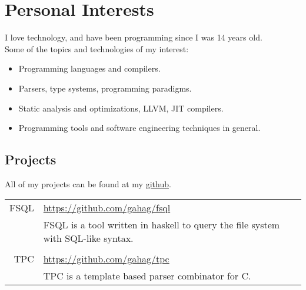 \documentclass[a4paper,10pt]{article}
\newcommand{\cpp}{C\protect\scalebox{0.8}{\protect\raisebox{0.4ex}{++}}}
\renewcommand\#{\protect\scalebox{0.8}{\protect\raisebox{0.4ex}{\char"0023}}}
\begin{document}
\section{Personal Interests}
I love technology, and have been programming since I was 14 years old. \\
Some of the topics and technologies of my interest:
\vspace{-3pt}
\begin{itemize}
  \setlength\itemsep{-3pt}
  \item Programming languages and compilers.
  \item Parsers, type systems, programming paradigms.
  \item Static analysis and optimizations, LLVM, JIT compilers.
  \item Programming tools and software engineering techniques in general.
\end{itemize}

\subsection{Projects}
All of my projects can be found at my \href{https://github.com/gahag/}{github}. \\[10pt]
\begin{tabular}{r|l}
  \textsc{FSQL} & \url{https://github.com/gahag/fsql} \\[3pt]
  & FSQL is a tool written in haskell to query the file system with SQL-like syntax. \\
  
  \multicolumn{2}{c}{} \\
  \textsc{TPC} & \url{https://github.com/gahag/tpc} \\[3pt]
  & TPC is a template based parser combinator for \cpp. \\
\end{tabular}
\end{document}
